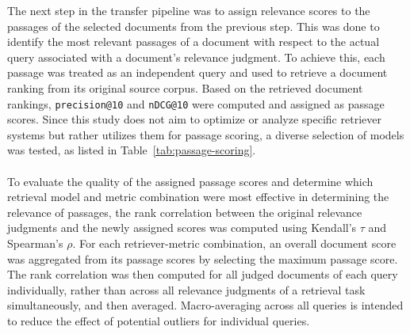 The next step in the transfer pipeline was to assign relevance scores to the passages of the selected documents from the previous step. This was done to identify the most relevant passages of a document with respect to the actual query associated with a document's relevance judgment. To achieve this, each passage was treated as an independent query and used to retrieve a document ranking from its original source corpus. Based on the retrieved document rankings, \texttt{precision@10} and \texttt{nDCG@10} were computed and assigned as passage scores. Since this study does not aim to optimize or analyze specific retriever systems but rather utilizes them for passage scoring, a diverse selection of models was tested, as listed in Table~\ref{tab:passage-scoring}.
\\\\
To evaluate the quality of the assigned passage scores and determine which retrieval model and metric combination were most effective in determining the relevance of passages, the rank correlation between the original relevance judgments and the newly assigned scores was computed using Kendall's $\tau$ and Spearman's $\rho$. For each retriever-metric combination, an overall document score was aggregated from its passage scores by selecting the maximum passage score. The rank correlation was then computed for all judged \mbox{documents} of each query individually, rather than across all relevance judgments of a retrieval task simultaneously, and then averaged. Macro-averaging across all queries is intended to reduce the effect of potential outliers for individual queries.
